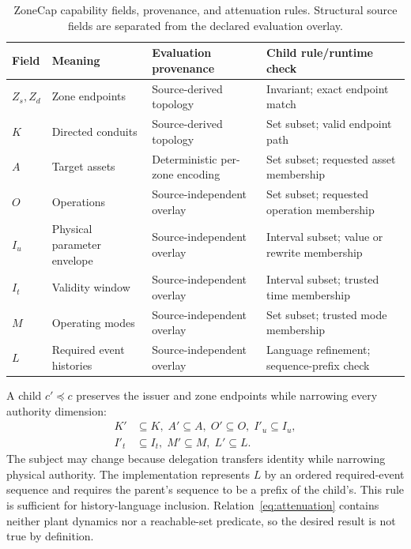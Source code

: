 \begin{table}[t]
\caption{ZoneCap capability fields, provenance, and attenuation rules. Structural source fields are separated from the declared evaluation overlay.}
\label{tab:fields}
\centering
\footnotesize
\setlength{\tabcolsep}{4pt}
\begin{tabular}{@{}llll@{}}
\toprule
Field & Meaning & Evaluation provenance & Child rule/runtime check \\
\midrule
$Z_s,Z_d$ & Zone endpoints & Source-derived topology & Invariant; exact endpoint match \\
$K$ & Directed conduits & Source-derived topology & Set subset; valid endpoint path \\
$A$ & Target assets & Deterministic per-zone encoding & Set subset; requested asset membership \\
$O$ & Operations & Source-independent overlay & Set subset; requested operation membership \\
$I_u$ & Physical parameter envelope & Source-independent overlay & Interval subset; value or rewrite membership \\
$I_t$ & Validity window & Source-independent overlay & Interval subset; trusted time membership \\
$M$ & Operating modes & Source-independent overlay & Set subset; trusted mode membership \\
$L$ & Required event histories & Source-independent overlay & Language refinement; sequence-prefix check \\
\bottomrule
\end{tabular}
\end{table}

A child $c'\preceq c$ preserves the issuer and zone endpoints while narrowing every authority dimension:
\begin{equation}
\begin{split}
K'&\subseteq K,\; A'\subseteq A,\; O'\subseteq O,\; I'_u\subseteq I_u,\\
I'_t&\subseteq I_t,\; M'\subseteq M,\; L'\subseteq L.
\end{split}
\label{eq:attenuation}
\end{equation}
The subject may change because delegation transfers identity while narrowing physical authority. The implementation represents $L$ by an ordered required-event sequence and requires the parent's sequence to be a prefix of the child's. This rule is sufficient for history-language inclusion. Relation~\eqref{eq:attenuation} contains neither plant dynamics nor a reachable-set predicate, so the desired result is not true by definition.

